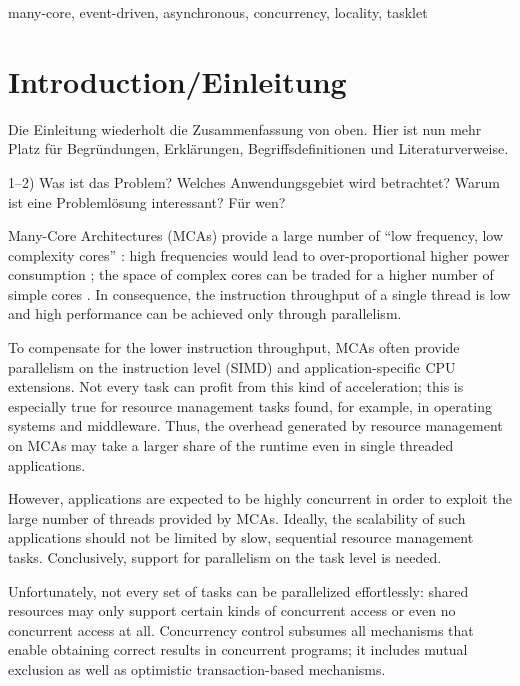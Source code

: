 \documentclass[journal]{IEEEtran}
\begin{document}
\begin{IEEEkeywords}
many-core, event-driven, asynchronous, concurrency, locality, tasklet
\end{IEEEkeywords}

\IEEEpeerreviewmaketitle


\section{Introduction/Einleitung}
\begin{itshape}
  Die Einleitung wiederholt die Zusammenfassung von oben. Hier ist nun
  mehr Platz für Begründungen, Erklärungen, Begriffsdefinitionen und
  Literaturverweise.  

  1--2) Was ist das Problem? Welches Anwendungsgebiet wird betrachtet?
  Warum ist eine Problemlösung interessant? Für wen?
\end{itshape}

\noindent Many-Core Architectures (MCAs) provide a large number of
``low frequency, low complexity cores'' \cite[p. 27]{vajda2011}: high
frequencies would lead to over-proportional higher power consumption
\cite[p. 2]{vajda2011}; the space of complex cores can be traded for a
higher number of simple cores \cite{challengesMCC}. In consequence,
the instruction throughput of a single thread is low and high
performance can be achieved only through parallelism.

To compensate for the lower instruction throughput, MCAs often provide
parallelism on the instruction level (SIMD) and application-specific
CPU extensions.
%
Not every task can profit from this kind of acceleration; this is
especially true for resource management tasks found, for example, in
operating systems and middleware.  Thus, the overhead generated by
resource management on MCAs may take a larger share of the runtime
even in single threaded applications.

However, applications are expected to be highly concurrent in order to
exploit the large number of threads provided by MCAs.  Ideally, the
scalability of such applications should not be limited by slow,
sequential resource management tasks.  Conclusively, support for
parallelism on the task level is needed.

Unfortunately, not every set of tasks can be parallelized
effortlessly: shared resources may only support certain kinds of
concurrent access or even no concurrent access at all.
%
Concurrency control subsumes all mechanisms that enable obtaining
correct results in concurrent programs; it includes mutual exclusion
as well as optimistic transaction-based mechanisms.
\end{document}
